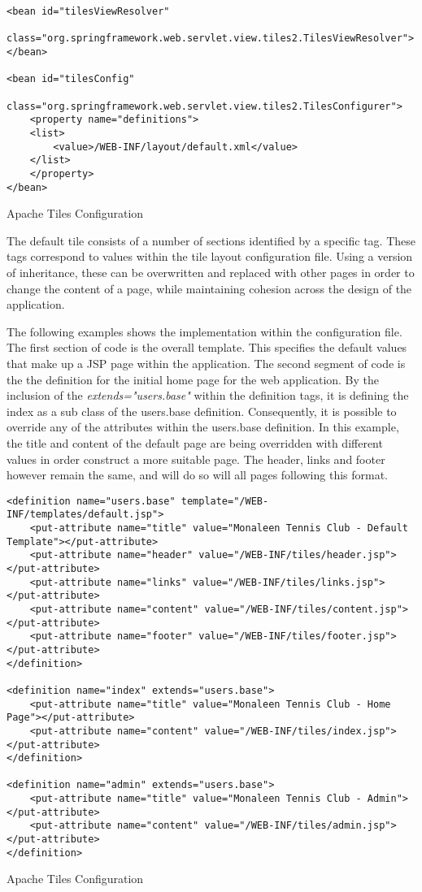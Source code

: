 \begin{table}[H]
\begin{lstlisting}
<bean id="tilesViewResolver"
	class="org.springframework.web.servlet.view.tiles2.TilesViewResolver">
</bean>

<bean id="tilesConfig"
	class="org.springframework.web.servlet.view.tiles2.TilesConfigurer">
	<property name="definitions">
	<list>
		<value>/WEB-INF/layout/default.xml</value>
	</list>
	</property>
</bean>
\end{lstlisting}
\caption{Apache Tiles Configuration}
\end{table}

The default tile consists of a number of sections identified by a specific tag. These tags correspond to values within the tile layout configuration file. Using a version of inheritance, these can be overwritten and replaced with other pages in order to change the content of a page, while maintaining cohesion across the design of the application. 

The following examples shows the implementation within the configuration file. The first section of code is the overall template. This specifies the default values that make up a JSP page within the application. The second segment of code is the the definition for the initial home page for the web application. By the inclusion of the \textit{extends="users.base"} within the definition tags, it is defining the index as a sub class of the users.base definition. Consequently, it is possible to override any of the attributes within the users.base definition. In this example, the title and content of the default page are being overridden with different values in order construct a more suitable page. The header, links and footer however remain the same, and will do so will all pages following this format.

\begin{table}[H]
\begin{lstlisting}
<definition name="users.base" template="/WEB-INF/templates/default.jsp">
	<put-attribute name="title" value="Monaleen Tennis Club - Default Template"></put-attribute>
	<put-attribute name="header" value="/WEB-INF/tiles/header.jsp"></put-attribute>
	<put-attribute name="links" value="/WEB-INF/tiles/links.jsp"></put-attribute>
	<put-attribute name="content" value="/WEB-INF/tiles/content.jsp"></put-attribute>
	<put-attribute name="footer" value="/WEB-INF/tiles/footer.jsp"></put-attribute>
</definition>

<definition name="index" extends="users.base">
	<put-attribute name="title" value="Monaleen Tennis Club - Home Page"></put-attribute>
	<put-attribute name="content" value="/WEB-INF/tiles/index.jsp"></put-attribute>
</definition>

<definition name="admin" extends="users.base">
	<put-attribute name="title" value="Monaleen Tennis Club - Admin"></put-attribute>
	<put-attribute name="content" value="/WEB-INF/tiles/admin.jsp"></put-attribute>
</definition>
\end{lstlisting}
\caption{Apache Tiles Configuration}
\end{table}
